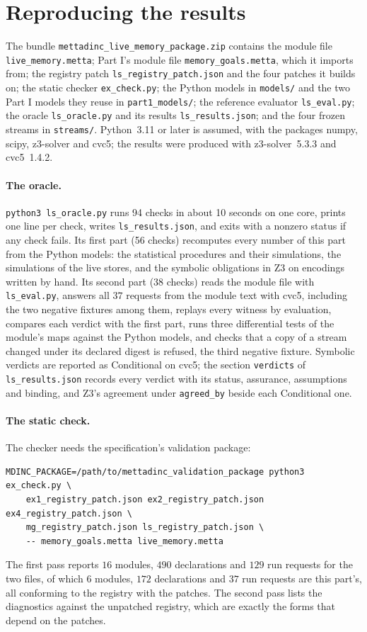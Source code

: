 \documentclass[11pt]{article}
\newcommand{\fpath}[1]{\nolinkurl{#1}}
\newcommand{\code}[1]{\texttt{#1}}
\theoremstyle{definition}
\theoremstyle{plain}
\begin{document}
\section{Reproducing the results}\label{app:repro}

The bundle \fpath{mettadinc_live_memory_package.zip} contains the module file
\fpath{live_memory.metta}; Part I's module file \fpath{memory_goals.metta}, which it imports from;
the registry patch \fpath{ls_registry_patch.json} and the four patches it builds on; the static
checker \fpath{ex_check.py}; the Python models in \fpath{models/} and the two Part I models they
reuse in \fpath{part1_models/}; the reference evaluator \fpath{ls_eval.py}; the oracle
\fpath{ls_oracle.py} and its results \fpath{ls_results.json}; and the four frozen streams in
\fpath{streams/}. Python~3.11 or later is assumed, with the packages numpy, scipy, z3-solver and
cvc5; the results were produced with z3-solver~5.3.3 and cvc5~1.4.2.

\paragraph{The oracle.} \code{python3 ls\_oracle.py} runs 94 checks in
about 10 seconds on one core, prints one line per check, writes
\fpath{ls_results.json}, and exits with a nonzero status if any check fails. Its first part
(56 checks) recomputes every number of this part from the Python models: the
statistical procedures and their simulations, the simulations of the live stores, and the symbolic
obligations in Z3 on encodings written by hand. Its second part (38 checks) reads
the module file with \fpath{ls_eval.py}, answers all $37$ requests from the module text with
cvc5, including the two negative fixtures among them, replays every witness by evaluation, compares
each verdict with the first part, runs three differential tests of the module's maps against the
Python models, and checks that a copy of a stream changed under its declared digest is refused, the
third negative fixture. Symbolic verdicts are reported as Conditional on cvc5; the section
\code{verdicts} of \fpath{ls_results.json} records every verdict with its status, assurance,
assumptions and binding, and Z3's agreement under \code{agreed\_by} beside each Conditional one.

\paragraph{The static check.} The checker needs the specification's validation package:
\begin{lstlisting}
MDINC_PACKAGE=/path/to/mettadinc_validation_package python3 ex_check.py \
    ex1_registry_patch.json ex2_registry_patch.json ex4_registry_patch.json \
    mg_registry_patch.json ls_registry_patch.json \
    -- memory_goals.metta live_memory.metta
\end{lstlisting}
The first pass reports $16$ modules, $490$ declarations and $129$ run requests for the two files,
of which $6$ modules, $172$ declarations and $37$ run requests are this part's, all conforming to
the registry with the patches. The second pass lists the diagnostics against the unpatched registry,
which are exactly the forms that depend on the patches.
\end{document}
